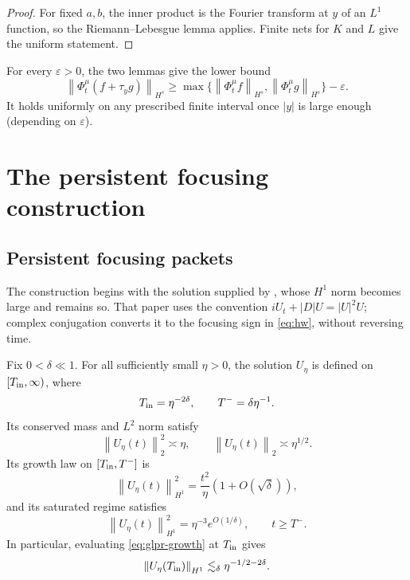 \documentclass[11pt,reqno]{amsart}
\numberwithin{equation}{section}
\theoremstyle{remark}
\newcommand{\norm}[1]{\left\lVert #1\right\rVert}
\newcommand{\flow}[1]{\Phi^{#1}}
\newcommand{\trans}[1]{\tau_{#1}}
\begin{document}
\begin{proof}
For fixed $a,b$, the inner product is the Fourier transform at $y$ of
an $L^1$ function, so the Riemann--Lebesgue lemma applies.  Finite nets for
$K$ and $L$ give the uniform statement.
\end{proof}

For every $\varepsilon>0$, the two lemmas give the lower bound
\begin{equation}\label{eq:max-lower}
 \norm{\flow\mu_t(f+\trans yg)}_{H^s}
 \geq\max\{\norm{\flow\mu_tf}_{H^s},
 \norm{\flow\mu_tg}_{H^s}\}-\varepsilon.
\end{equation}
It holds uniformly on any prescribed finite interval once $|y|$ is large
enough (depending on $\varepsilon$).

\section{The persistent focusing construction}
\label{sec:persistent-focusing}

\subsection{Persistent focusing packets}

The construction begins with the solution supplied by
\cite[Theorem~1.2]{GLPR}, whose $H^1$ norm becomes large and remains so.  That
paper uses the convention
$iU_t+|D|U=|U|^2U$; complex conjugation converts it to the focusing sign in
\eqref{eq:hw}, without reversing time.

Fix $0<\delta\ll1$.  For all sufficiently small $\eta>0$, the solution
$U_\eta$ is defined on $[T_{\rm in},\infty)$, where
\begin{equation}\label{eq:times}
 T_{\rm in}=\eta^{-2\delta},
 \qquad T^-=\delta\eta^{-1}.
\end{equation}
Its conserved mass and $L^2$ norm satisfy
\begin{equation}\label{eq:glpr-mass}
 \norm{U_\eta(t)}_2^2\asymp\eta,
 \qquad \norm{U_\eta(t)}_2\asymp\eta^{1/2}.
\end{equation}
Its growth law on
$[T_{\rm in},T^-]$ is
\begin{equation}\label{eq:glpr-growth}
 \norm{U_\eta(t)}_{H^1}^2
 =\frac{t^2}{\eta}(1+O(\sqrt\delta)),
\end{equation}
and its saturated regime satisfies
\begin{equation}\label{eq:glpr-saturation}
 \norm{U_\eta(t)}_{H^1}^2
 =\eta^{-3}e^{O(1/\delta)},
 \qquad t\geq T^-.
\end{equation}
In particular, evaluating \eqref{eq:glpr-growth} at $T_{\rm in}$ gives
\begin{equation}\label{eq:glpr-initial-h1}
 \norm{U_\eta(T_{\rm in})}_{H^1}
 \lesssim_\delta\eta^{-1/2-2\delta}.
\end{equation}
\end{document}
